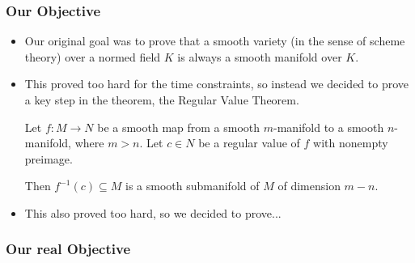 \documentclass{beamer}
\begin{document}
\begin{frame}
\frametitle{Our Objective}
\begin{itemize}
    \item Our original goal was to prove that a smooth variety (in the sense of scheme theory) over a normed field $K$ is always a smooth manifold over $K$. 
    \pause 
    \item This proved too hard for the time constraints, so instead we decided to prove a key step in the theorem, the Regular Value Theorem.
    \pause
\begin{theorem}
    Let $f:M \to N$ be a smooth map from a smooth $m$-manifold to a smooth $n$-manifold, where $m > n$. Let $c \in N$ be a regular value of $f$ with nonempty preimage. 
    
    Then $f^{-1}(c) \subseteq M$ is a smooth submanifold of $M$ of dimension $m - n$.
\end{theorem}
\pause 
\item This also proved too hard, so we decided to prove... 
\end{itemize}
\end{frame}
\begin{frame}
    \frametitle{Our \textbf{real} Objective}
\end{frame}
\end{document}

